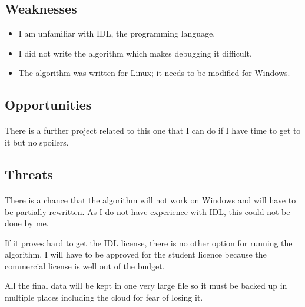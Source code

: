 \documentclass{article}
\begin{document}
\subsection{Weaknesses}

\begin{itemize}
\item I am unfamiliar with IDL, the programming language.
\item I did not write the algorithm which makes debugging it difficult.
\item The algorithm was written for Linux; it needs to be modified for Windows. 
\end{itemize}


\subsection{Opportunities}
\paragraph{}
There is a further project related to this one that I can do if I have time to get to it but no spoilers.

\subsection{Threats}
\paragraph{}
There is a chance that the algorithm will not work on Windows and will have to be partially rewritten. As I do not have experience with IDL, this could not be done by me. 

If it proves hard to get the IDL license, there is no other option for running the algorithm. I will have to be approved for the student licence because the commercial license is well out of the budget. 

All the final data will be kept in one very large file so it must be backed up in multiple places including the cloud for fear of losing it. 

\newpage
\begin{appendix}
\listoffigures
\listoftables
\end{appendix}

\newpage

\end{document}
